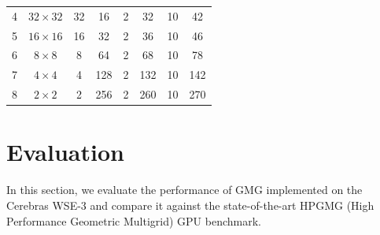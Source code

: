 \documentclass[sigconf]{acmart}
\begin{document}
\begin{table}[t]
\begin{small}
\begin{tabular}{@{}cccccccc@{}}
        4 & $32\times32$   & 32  & 16  & 2 & 32  & 10 & 42  \\
        5 & $16\times16$   & 16  & 32  & 2 & 36  & 10 & 46  \\
        6 & $8\times8$     & 8   & 64  & 2 & 68  & 10 & 78  \\
        7 & $4\times4$     & 4   & 128 & 2 & 132 & 10 & 142 \\
        8 & $2\times2$     & 2   & 256 & 2 & 260 & 10 & 270 \\
        \bottomrule
    \end{tabular}
    \end{small}
\end{table}


\section{Evaluation}

In this section, we evaluate the performance of %
GMG implemented on the Cerebras WSE-3 %
and compare it against the state-of-the-art %
HPGMG (High Performance Geometric Multigrid) GPU benchmark. %

\end{document}
